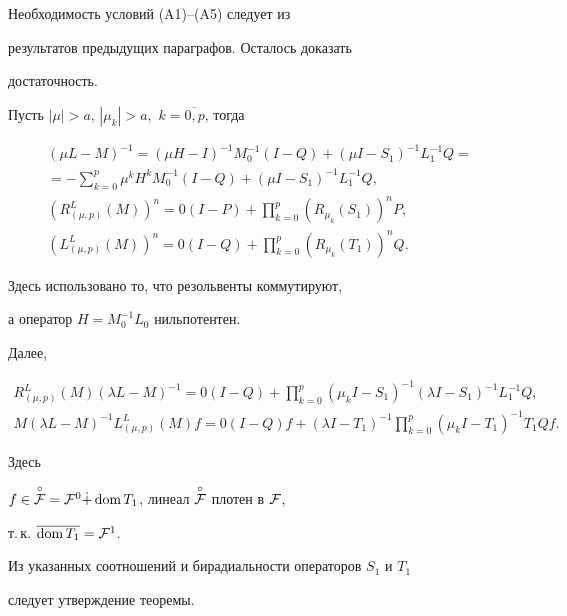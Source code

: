 \begin{pf}


Необходимость условий (A1)--(A5) следует из


результатов предыдущих параграфов. Осталось доказать


достаточность.





Пусть $|\mu |>a$, $|\mu_k|>a, $ $ k=\overline{0,p}$, тогда


\begin{gather*}


(\mu L-M)^{-1}=(\mu H-I)^{-1}M^{-1}_0(I-Q)+(\mu I-S_1)^{-1}L^{-1}_1Q=\\


=-\sum^p_{k=0} \mu ^k H^kM_0^{-1}(I-Q)+(\mu I-S_1)^{-1}L_1^{-1}Q,\\


(R^L_{(\mu ,p)}(M))^n=0(I-P)+\prod^p_{k=0} (R_{\mu_k}(S_1))^nP,\\


(L^L_{(\mu ,p)}(M))^n=0(I-Q)+\prod_{k=0}^p (R_{\mu_k}(T_1))^nQ.


\end{gather*}


Здесь использовано то, что резольвенты коммутируют,


а оператор $H=M_0^{-1}L_0$ нильпотентен.


Далее,


\begin{gather*}


R^L_{(\mu ,p)}(M)(\lambda L-M)^{-1}=0(I-Q)+\prod_{k=0}^p (\mu_k I-S_1)^{-1}


(\lambda I-S_1)^{-1}L^{-1}_1Q,\\


M(\lambda L-M)^{-1}L^L_{(\mu ,p)}(M)f=0(I-Q)f+(\lambda I-T_1)^{-1}


\prod_{k=0}^p (\mu_k I-T_1)^{-1}T_1Qf.


\end{gather*}


Здесь


$f\in\overset{\circ}{{\cal F}}{}={\cal F}^0 \Dot


+ \dom T_1$, линеал $\overset{\circ}{{\cal F}}{}$ плотен в ${\cal F}$,


т.\,к. $\overline{\operatorname{dom} T_1}={\cal F}^1$.


Из указанных соотношений и бирадиальности операторов $S_1$ и $T_1$


следует утверждение теоремы.


\end{pf}





